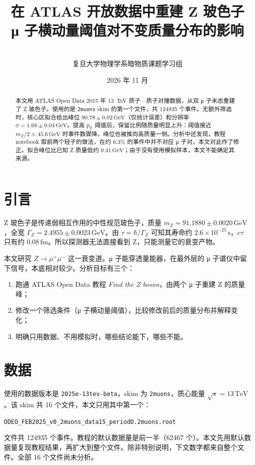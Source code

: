 \documentclass[11pt,a4paper,fontset=windows]{ctexart}
\title{\bfseries 在 ATLAS 开放数据中重建 Z 玻色子\\[4pt]\large μ 子横动量阈值对不变质量分布的影响}
\author{\studentname\\[2pt]\small 复旦大学物理学系\quad 暗物质课题学习组}
\date{2026 年 11 月}
\newcommand{\pT}{p_{\mathrm{T}}}
\newcommand{\GeV}{\,\mathrm{GeV}}
\begin{document}
\maketitle

\begin{abstract}
本文用 ATLAS Open Data 2015 年 13~TeV 质子—质子对撞数据，从双 μ 子末态重建了 Z 玻色子。使用的是 \texttt{2muons} skim 的第一个文件，共 124935 个事件。无额外筛选时，核心区拟合给出峰位 $90.78\pm0.02\GeV$（仅统计误差）和分辨率 $\sigma=1.68\pm0.04\GeV$。提高 $\pT$ 阈值后，保留比例随质量明显上升：阈值接近 $m_Z/2\approx45.6\GeV$ 时事件数骤降，峰位也被推向高质量一侧。分析中还发现，教程 notebook 取前两个轻子的做法，在约 6.3\% 的事件中并不对应 μ 子对，本文对此作了修正。拟合峰位比已知 Z 质量低约 $0.41\GeV$；由于没有使用模拟样本，本文不能确定其来源。
\end{abstract}

\section{引言}

Z 玻色子是传递弱相互作用的中性规范玻色子，质量 $m_Z=91.1880\pm0.0020\GeV$，全宽 $\Gamma_Z=2.4955\pm0.0023\GeV$\cite{pdg}。由 $\tau=\hbar/\Gamma_Z$ 可知其寿命约 $2.6\times10^{-25}\,\mathrm{s}$，$c\tau$ 只有约 $0.08\,\mathrm{fm}$。所以探测器无法直接看到 Z，只能测量它的衰变产物。

本文研究 $Z\to\mu^+\mu^-$ 这一衰变道。μ 子能穿透量能器，在最外层的 μ 子谱仪中留下信号，本底相对较少。分析目标有三个：
\begin{enumerate}
  \item 跑通 ATLAS Open Data 教程 \emph{Find the Z boson}\cite{atlas}，由两个 μ 子重建 Z 的质量峰；
  \item 修改一个筛选条件（μ 子横动量阈值），比较修改前后的质量分布并解释变化；
  \item 明确只用数据、不用模拟时，哪些结论能下，哪些不能。
\end{enumerate}

\section{数据}

使用的数据版本是 \texttt{2025e-13tev-beta}，skim 为 \texttt{2muons}，质心能量 $\sqrt{s}=13\,\mathrm{TeV}$。该 skim 共 16 个文件，本文只用其中第一个：
\begin{center}
\texttt{ODEO\_FEB2025\_v0\_2muons\_data15\_periodD.2muons.root}
\end{center}
文件共 124935 个事件。教程的默认数据量是前一半（62467 个）。本文先用默认数据量复现教程结果，再扩大到整个文件。除非特别说明，下文数字都来自整个文件。全部 16 个文件尚未分析。
\end{document}
